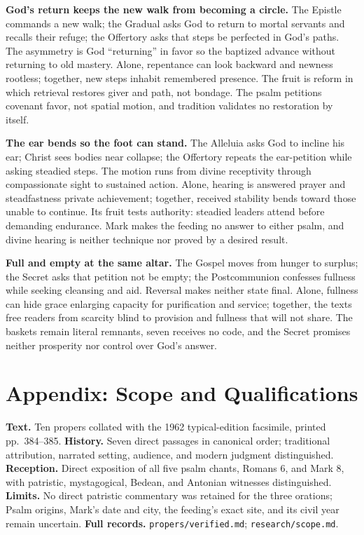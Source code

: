 \begin{deepstudy}
\noindent\textbf{God's return keeps the new walk from becoming a circle.\enspace{}}
The Epistle commands a new walk; the Gradual asks God to return to mortal servants and recalls their refuge; the Offertory asks that steps be perfected in God's paths. The asymmetry is God ``returning'' in favor so the baptized advance without returning to old mastery. Alone, repentance can look backward and newness rootless; together, new steps inhabit remembered presence. The fruit is reform in which retrieval restores giver and path, not bondage. The psalm petitions covenant favor, not spatial motion, and tradition validates no restoration by itself.

\noindent\textbf{The ear bends so the foot can stand.\enspace{}}
The Alleluia asks God to incline his ear; Christ sees bodies near collapse; the Offertory repeats the ear-petition while asking steadied steps. The motion runs from divine receptivity through compassionate sight to sustained action. Alone, hearing is answered prayer and steadfastness private achievement; together, received stability bends toward those unable to continue. Its fruit tests authority: steadied leaders attend before demanding endurance. Mark makes the feeding no answer to either psalm, and divine hearing is neither technique nor proved by a desired result.

\noindent\textbf{Full and empty at the same altar.\enspace{}}
The Gospel moves from hunger to surplus; the Secret asks that petition not be empty; the Postcommunion confesses fullness while seeking cleansing and aid. Reversal makes neither state final. Alone, fullness can hide grace enlarging capacity for purification and service; together, the texts free readers from scarcity blind to provision and fullness that will not share. The baskets remain literal remnants, seven receives no code, and the Secret promises neither prosperity nor control over God's answer.

\sectionguard
\clearpage

\section*{Appendix: Scope and Qualifications}

\begin{studyframe}
\textbf{Text.} Ten propers collated with the 1962 typical-edition facsimile, printed pp.~384--385. \textbf{History.} Seven direct passages in canonical order; traditional attribution, narrated setting, audience, and modern judgment distinguished. \textbf{Reception.} Direct exposition of all five psalm chants, Romans 6, and Mark 8, with patristic, mystagogical, Bedean, and Antonian witnesses distinguished. \textbf{Limits.} No direct patristic commentary was retained for the three orations; Psalm origins, Mark's date and city, the feeding's exact site, and its civil year remain uncertain. \textbf{Full records.} \nolinkurl{propers/verified.md}; \nolinkurl{research/scope.md}.
\end{studyframe}


\end{deepstudy}
